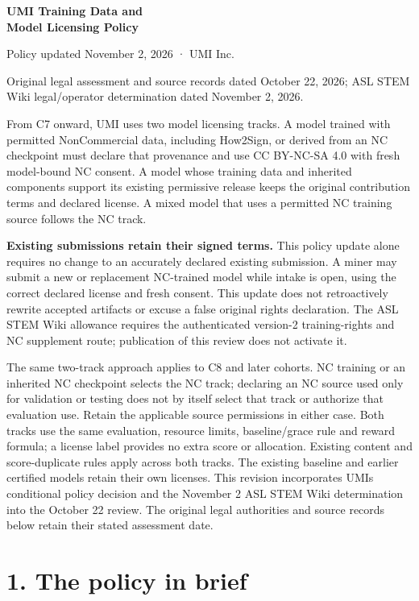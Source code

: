\documentclass[10pt,a4paper]{article}
\begin{document}
{\huge\sffamily\bfseries\color{navy} UMI Training Data and\\[3pt] Model Licensing Policy\par}
\vspace{4pt}
Policy updated November 2, 2026 · UMI Inc.

Original legal assessment and source records dated October 22, 2026;
ASL STEM Wiki legal/operator determination dated November 2, 2026.

From C7 onward, UMI uses two model licensing tracks. A model trained
with permitted NonCommercial data, including How2Sign, or derived from
an NC checkpoint must declare that provenance and use CC BY-NC-SA 4.0
with fresh model-bound NC consent. A model whose training data and
inherited components support its existing permissive release keeps the
original contribution terms and declared license. A mixed model that
uses a permitted NC training source follows the NC track.

\textbf{Existing submissions retain their signed terms.} This policy
update alone requires no change to an accurately declared existing
submission. A miner may submit a new or replacement NC-trained model
while intake is open, using the correct declared license and fresh
consent. This update does not retroactively rewrite accepted artifacts
or excuse a false original rights declaration. The ASL STEM Wiki
allowance requires the authenticated version-2 training-rights and NC
supplement route; publication of this review does not activate it.

The same two-track approach applies to C8 and later cohorts. NC training or
an inherited NC checkpoint selects the NC track; declaring an NC source
used only for validation or testing does not by itself select that track
or authorize that evaluation use. Retain the applicable source
permissions in either case. Both tracks use the same evaluation,
resource limits, baseline/grace rule and reward formula; a license label
provides no extra score or allocation. Existing content and
score-duplicate rules apply across both tracks. The existing baseline
and earlier certified models retain their own licenses. This revision
incorporates UMI\textquotesingle s conditional policy decision and the
November 2 ASL STEM Wiki determination into the October 22 review. The
original legal authorities and source records below retain their stated
assessment date.

\section{1. The policy in brief}\label{1-the-policy-in-brief}
\end{document}
